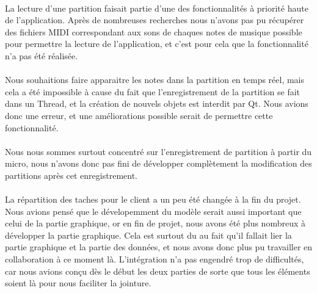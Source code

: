 \paragraph{}
La lecture d'une partition faisait partie d'une des fonctionnalités à priorité haute de l'application. Après 
de nombreuses recherches nous n'avons pas pu récupérer des fichiers MIDI correspondant aux sons de chaques 
notes de musique possible pour permettre la lecture de l'application, et c'est pour cela que la fonctionnalité 
n'a pas été réalisée.

\paragraph{}
Nous souhaitions faire apparaitre les notes dans la partition en temps réel, mais cela a été impossible à cause 
du fait que l'enregistrement de la partition se fait dans un Thread, et la création de nouvels objets est 
interdit par Qt. Nous avions donc une erreur, et une améliorations possible serait de permettre cette fonctionnalité.

\paragraph{}
Nous nous sommes surtout concentré sur l'enregistrement de partition à partir du micro, nous n'avons donc pas fini 
de développer complètement la modification des partitions après cet enregistrement.

\paragraph{}
La répartition des taches pour le client a un peu été changée à la fin du projet. Nous avions pensé que le dévelopemment 
du modèle serait aussi important que celui de la partie graphique, or en fin de projet, nous avons été plus nombreux à 
développer la partie graphique. Cela est surtout du au fait qu'il fallait lier la partie graphique et la partie des données, 
et nous avons donc plus pu travailler en collaboration à ce moment là. L'intégration n'a pas engendré trop de difficultés, car 
nous avions conçu dès le début les deux parties de sorte que tous les éléments soient là pour nous faciliter la jointure.